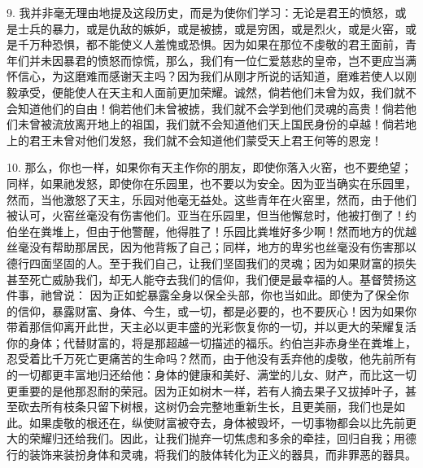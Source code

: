 9. 我并非毫无理由地提及这段历史，而是为使你们学习：无论是君王的愤怒，或是士兵的暴力，或是仇敌的嫉妒，或是被掳，或是穷困，或是烈火，或是火窑，或是千万种恐惧，都不能使义人羞愧或恐惧。因为如果在那位不虔敬的君王面前，青年们并未因暴君的愤怒而惊慌，那么，我们有一位仁爱慈悲的皇帝，岂不更应当满怀信心，为这磨难而感谢天主吗？因为我们从刚才所说的话知道，磨难若使人以刚毅承受，便能使人在天主和人面前更加荣耀。诚然，倘若他们未曾为奴，我们就不会知道他们的自由！倘若他们未曾被掳，我们就不会学到他们灵魂的高贵！倘若他们未曾被流放离开地上的祖国，我们就不会知道他们天上国民身份的卓越！倘若地上的君王未曾对他们发怒，我们就不会知道他们蒙受天上君王何等的恩宠！\par

10. 那么，你也一样，如果你有天主作你的朋友，即使你落入火窑，也不要绝望；同样，如果祂发怒，即使你在乐园里，也不要以为安全。因为亚当确实在乐园里，然而，当他激怒了天主，乐园对他毫无益处。这些青年在火窑里，然而，由于他们被认可，火窑丝毫没有伤害他们。亚当在乐园里，但当他懈怠时，他被打倒了！约伯坐在粪堆上，但由于他警醒，他得胜了！乐园比粪堆好多少啊！然而地方的优越丝毫没有帮助那居民，因为他背叛了自己；同样，地方的卑劣也丝毫没有伤害那以德行四面坚固的人。至于我们自己，让我们坚固我们的灵魂；因为如果财富的损失甚至死亡威胁我们，却无人能夺去我们的信仰，我们便是最幸福的人。基督赞扬这件事，祂曾说：  因为正如蛇暴露全身以保全头部，你也当如此。即使为了保全你的信仰，暴露财富、身体、今生，或一切，都是必要的，也不要灰心！因为如果你带着那信仰离开此世，天主必以更丰盛的光彩恢复你的一切，并以更大的荣耀复活你的身体；代替财富的，将是那超越一切描述的福乐。约伯岂非赤身坐在粪堆上，忍受着比千万死亡更痛苦的生命吗？然而，由于他没有丢弃他的虔敬，他先前所有的一切都更丰富地归还给他：身体的健康和美好、满堂的儿女、财产，而比这一切更重要的是他那忍耐的荣冠。因为正如树木一样，若有人摘去果子又拔掉叶子，甚至砍去所有枝条只留下树根，这树仍会完整地重新生长，且更美丽，我们也是如此。如果虔敬的根还在，纵使财富被夺去，身体被毁坏，一切事物都会以比先前更大的荣耀归还给我们。因此，让我们抛弃一切焦虑和多余的牵挂，回归自我；用德行的装饰来装扮身体和灵魂，将我们的肢体转化为正义的器具，而非罪恶的器具。\par


